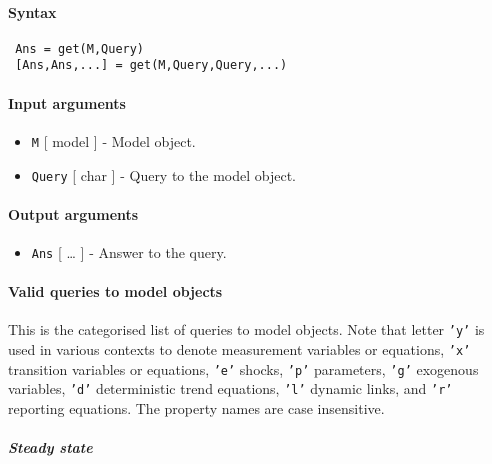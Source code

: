 


	\paragraph{Syntax}
 
 \begin{verbatim}
 Ans = get(M,Query)
 [Ans,Ans,...] = get(M,Query,Query,...)
 \end{verbatim}
 
 \paragraph{Input arguments}
 
 \begin{itemize}
 \item
   \texttt{M} {[} model {]} - Model object.
 \item
   \texttt{Query} {[} char {]} - Query to the model object.
 \end{itemize}
 
 \paragraph{Output arguments}
 
 \begin{itemize}
 \item
   \texttt{Ans} {[} \ldots{} {]} - Answer to the query.
 \end{itemize}
 
 \paragraph{Valid queries to model objects}
 
 This is the categorised list of queries to model objects. Note that
 letter \texttt{'y'} is used in various contexts to denote measurement
 variables or equations, \texttt{'x'} transition variables or equations,
 \texttt{'e'} shocks, \texttt{'p'} parameters, \texttt{'g'} exogenous
 variables, \texttt{'d'} deterministic trend equations, \texttt{'l'}
 dynamic links, and \texttt{'r'} reporting equations. The property names
 are case insensitive.
 
 \subparagraph{Steady state}
 
